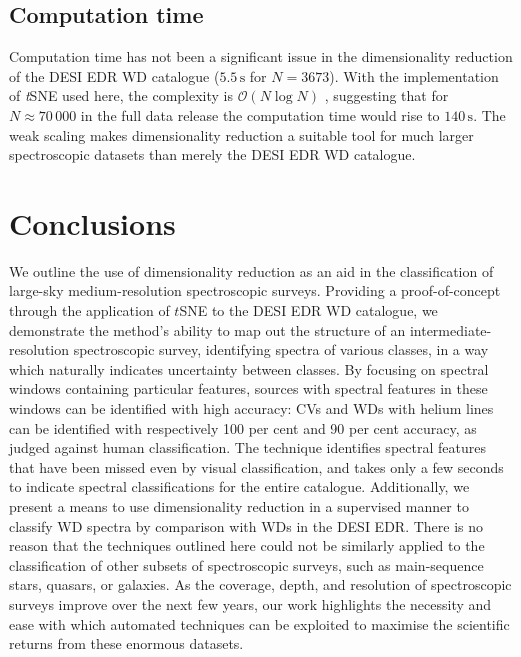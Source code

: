 \documentclass[fleqn,usenatbib]{mnras}
\begin{document}
\subsection{Computation time}

Computation time has not been a significant issue in the dimensionality reduction of the DESI EDR WD catalogue ($5.5\,\text{s}$ for $N=3673$).
With the implementation of \textit{t}SNE used here, the complexity is $\mathcal{O}(N\log N)$ \citep{barneshut, vandermaaten14}, suggesting that for $N\approx 70\,000$ in the full data release the computation time would rise to $140\,\text{s}$.
The weak scaling makes dimensionality reduction a suitable tool for much larger spectroscopic datasets than merely the DESI EDR WD catalogue.

\section{Conclusions}
\label{sec:conclusions}

We outline the use of dimensionality reduction as an aid in the classification of large-sky medium-resolution spectroscopic surveys.
Providing a proof-of-concept through the application of $t$SNE to the DESI EDR WD catalogue, we demonstrate the method's ability to map out the structure of an intermediate-resolution spectroscopic survey, identifying spectra of various classes, in a way which naturally indicates uncertainty between classes.
By focusing on spectral windows containing particular features, sources with spectral features in these windows can be identified with high accuracy: CVs and WDs with helium lines can be identified with respectively 100 per cent and 90 per cent accuracy, as judged against human classification.
The technique identifies spectral features that have been missed even by visual classification, and takes only a few seconds to indicate spectral classifications for the entire catalogue.
Additionally, we present a means to use dimensionality reduction in a supervised manner to classify WD spectra by comparison with WDs in the DESI EDR.
There is no reason that the techniques outlined here could not be similarly applied to the classification of other subsets of spectroscopic surveys, such as main-sequence stars, quasars, or galaxies.
As the coverage, depth, and resolution of spectroscopic surveys improve over the next few years, our work highlights the necessity and ease with which automated techniques can be exploited to maximise the scientific returns from these enormous datasets.
\end{document}
